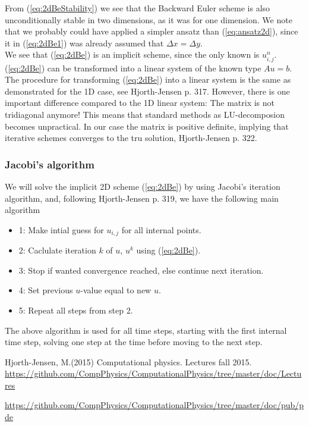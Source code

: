 \documentclass{article}
\begin{document}
From (\ref{eq:2dBeStability}) we see that the Backward Euler scheme is also unconditionally stable in two dimensions, as it was for one dimension. We note that we probably could have applied a simpler ansatz than (\ref{eq:ansatz2d}), since it in (\ref{eq:2dBe1}) was already assumed that $\Delta x = \Delta y$.\\

We see that (\ref{eq:2dBe}) is an implicit scheme, since the only known is $u_{i,j}^n$. (\ref{eq:2dBe}) can be transformed into a linear system of the known type $Au = b$. The procedure for transforming (\ref{eq:2dBe}) into a linear system is the same as demonstrated for the 1D case, see Hjorth-Jensen \cite{MHJ} p. 317. However, there is one important difference compared to the 1D linear system: The matrix is not tridiagonal anymore! This means that standard methods as LU-decomposion becomes unpractical. In our case the matrix is positive definite, implying that iterative schemes converges to the tru solution, Hjorth-Jensen \cite{MHJ} p. 322. 

\subsubsection{Jacobi's algorithm}
We will solve the implicit 2D scheme (\ref{eq:2dBe}) by using Jacobi's iteration algorithm, and, following Hjorth-Jensen \cite{MHJ} p. 319, we have the following main algorithm

\begin{itemize}
	\item{1: Make intial guess for $u_{i,j}$ for all internal points.}
	\item{2: Caclulate iteration $k$ of $u$, $u^k$ using (\ref{eq:2dBe})}.
	\item{3: Stop if wanted convergence reached, else continue next iteration.}
	\item{4: Set previous $u$-value equal to new $u$.}
	\item{5: Repeat all steps from step 2.}
\end{itemize}

The above algorithm is used for all time steps, starting with the first internal time step, solving one step at the time before moving to the next step.



\begin{thebibliography}{9}
	Hjorth-Jensen, M.(2015)
	Computational physics. Lectures fall 2015. 
	\url{https://github.com/CompPhysics/ComputationalPhysics/tree/master/doc/Lectures}
	
	\url{https://github.com/CompPhysics/ComputationalPhysics/tree/master/doc/pub/pde}

\end{thebibliography}
\end{document}
